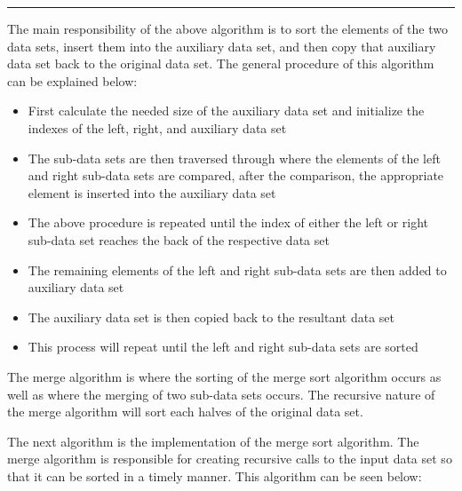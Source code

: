 \documentclass[a4paper,9pt]{article}
\newcommand{\horizontalline}{\noindent \rule{\textwidth}{0.5pt}\par}
\begin{document}
\begin{highlight}
    \horizontalline

    \noindent The main responsibility of the above algorithm is to sort the elements of the two data sets, insert them into the auxiliary data set, and then copy that auxiliary data set back to the original data set. The general procedure of this algorithm can be explained below:
    
    \begin{itemize}
        \item First calculate the needed size of the auxiliary data set and initialize the indexes of the left, right, and auxiliary data set
        \item The sub-data sets are then traversed through where the elements of the left and right sub-data sets are compared, after the comparison, the appropriate element is inserted into the auxiliary data set
        \item The above procedure is repeated until the index of either the left or right sub-data set reaches the back of the respective data set
        \item The remaining elements of the left and right sub-data sets are then added to auxiliary data set
        \item The auxiliary data set is then copied back to the resultant data set
        \item This process will repeat until the left and right sub-data sets are sorted
    \end{itemize}

    \noindent The merge algorithm is where the sorting of the merge sort algorithm occurs as well as where the merging of two sub-data sets occurs. The recursive nature of the merge algorithm will sort each halves of the original data set. 
\end{highlight}

The next algorithm is the implementation of the merge sort algorithm. The merge algorithm is responsible for creating recursive calls to the input data set so that it can be sorted in a timely manner. This algorithm can be seen below:
\end{document}
